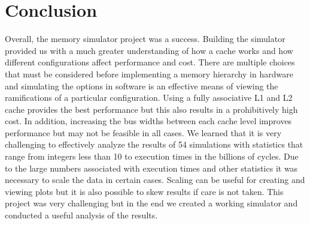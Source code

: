 \documentclass[11pt,titlepage]{article}
\begin{document}
\section{Conclusion}
    Overall, the memory simulator project was a success. Building the simulator provided us with a much greater understanding of how a cache works and how different configurations affect performance and cost. There are multiple choices that must be considered before implementing a memory hierarchy in hardware and simulating the options in software is an effective means of viewing the ramifications of a particular configuration. Using a fully associative L1 and L2 cache provides the best performance but this also results in a prohibitively high cost. In addition, increasing the bus widths between each cache level improves performance but may not be feasible in all cases. We learned that it is very challenging to effectively analyze the results of 54 simulations with statistics that range from integers less than 10 to execution times in the billions of cycles.  Due to the large numbers associated with execution times and other statistics it was necessary to scale the data in certain cases. Scaling can be useful for creating and viewing plots but it is also possible to skew results if care is not taken. This project was very challenging but in the end we created a working simulator and conducted a useful analysis of the results.
\end{document}
